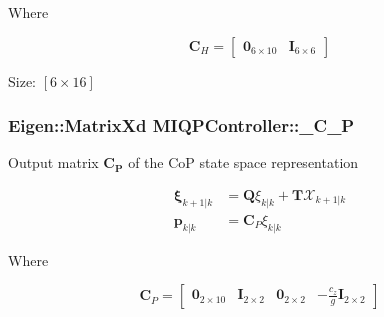 \-Where

\[ \mathbf{C}_H = \left[ \begin{array}{cc} \mathbf{0}_{6\times10} & \mathbf{I}_{6\times6} \end{array} \right] \]

\-Size\-: $[6\times16]$ \hypertarget{classMIQPController_a17cf6f8279cf6b2ce333feb9c8fc5a5d}{
\subsubsection[{\-\_\-\-C\-\_\-\-P}]{\setlength{\rightskip}{0pt plus 5cm}\-Eigen\-::\-Matrix\-Xd {\bf \-M\-I\-Q\-P\-Controller\-::\-\_\-\-C\-\_\-\-P}}}\label{classMIQPController_a17cf6f8279cf6b2ce333feb9c8fc5a5d}
\-Output matrix $\mathbf{C_P}$ of the \-Co\-P state space representation

\begin{align*} \mathbf{\xi}_{k+1|k} &= \mathbf{Q} \xi_{k|k} + \mathbf{T}\mathcal{X}_{k+1|k} \\ \mathbf{p}_{k|k} & =\mathbf{C}_P \xi_{k|k} \end{align*}

\-Where

\[ \mathbf{C}_P = \left[ \begin{array}{ccccc} \mathbf{0}_{2\times10} & \mathbf{I}_{2\times2} & \mathbf{0}_{2\times2} & -\frac{c_z}{g}\mathbf{I}_{2\times2} \end{array}\right] \]

